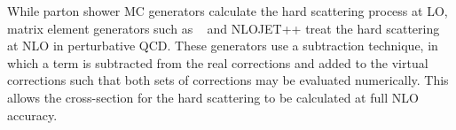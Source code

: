 While parton shower MC generators calculate the hard scattering process at LO, matrix element generators such as \POWHEG~\cite{powheg} and NLOJET++\cite{NLOjetpp} treat the hard scattering at NLO in perturbative QCD. These generators use a subtraction\cite{CataniSeymour} technique, in which a term is subtracted from the real corrections and added to the virtual corrections such that both sets of corrections may be evaluated numerically. This allows the cross-section for the hard scattering to be calculated at full NLO accuracy. 








%



